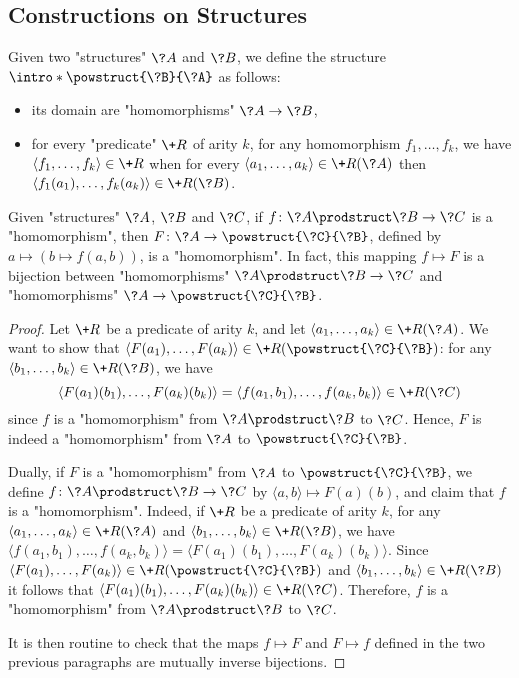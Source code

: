 \subsection{Constructions on Structures}

Given two "structures" $\?A$ and $\?B$, we define the structure \AP$\intro*\powstruct{\?B}{\?A}$ as follows:
\begin{itemize}
  \item its domain are "homomorphisms" $\?A \to \?B$,
  \item for every "predicate" $\+R$ of arity $k$, for any homomorphism $f_1,\hdots,f_k$,
  we have $\langle f_1,\hdots,f_k\rangle \in \+R$ when for every
  $\langle a_1,\hdots,a_k\rangle \in \+R(\?A)$
  then $\langle f_1(a_1), \hdots, f_k(a_k) \rangle \in \+R(\?B)$.
\end{itemize}


\begin{proposition}
	\AP\label{prop:currying-hom}
	Given "structures" $\?A$, $\?B$ and $\?C$, if $f\colon \?A\prodstruct \?B \to \?C$
	is a "homomorphism", then $F\colon \?A \to \powstruct{\?C}{\?B}$,
	defined by $a \mapsto (b \mapsto f(a,b))$, is a "homomorphism".
	In fact, this mapping $f \mapsto F$ is a bijection
	between "homomorphisms" $\?A\prodstruct \?B \to \?C$
	and "homomorphisms" $\?A \to \powstruct{\?C}{\?B}$.
\end{proposition}

\begin{proof}
Let $\+R$ be a predicate of arity $k$, and let
$\langle a_1,\hdots,a_k \rangle \in \+R(\?A)$.
We want to show that $\langle F(a_1),\hdots,F(a_k) \rangle \in \+R(\powstruct{\?C}{\?B})$:
for any $\langle b_1,\hdots,b_k \rangle \in \+R(\?B)$, we have
\[\langle F(a_1)(b_1), \hdots, F(a_k)(b_k)\rangle = \langle f(a_1,b_1),\hdots,f(a_k,b_k) \rangle \in \+R(\?C)\] since $f$ is a "homomorphism" from $\?A\prodstruct \?B$ to $\?C$.
Hence, $F$ is indeed a "homomorphism" from $\?A$ to $\powstruct{\?C}{\?B}$.

Dually, if $F$ is a "homomorphism" from $\?A$ to $\powstruct{\?C}{\?B}$,
we define $f\colon \?A\prodstruct \?B \to \?C$ by $\langle a,b \rangle \mapsto F(a)(b)$,
and claim that $f$ is a "homomorphism". Indeed, if $\+R$ be a predicate of arity $k$,
for any $\langle a_1, \hdots, a_k \rangle \in \+R(\?A)$
and $\langle b_1, \hdots, b_k \rangle \in \+R(\?B)$,
we have $\langle f(a_1,b_1), \hdots, f(a_k,b_k) \rangle
= \langle F(a_1)(b_1), \hdots, F(a_k)(b_k) \rangle$.
Since $\langle F(a_1), \hdots, F(a_k) \rangle \in \+R(\powstruct{\?C}{\?B})$
and $\langle b_1, \hdots,b_k \rangle \in \+R(\?B)$ 
it follows that $\langle F(a_1)(b_1), \hdots, F(a_k)(b_k) \rangle \in \+R(\?C)$.
Therefore, $f$ is a "homomorphism" from $\?A \prodstruct \?B$ to $\?C$.

It is then routine to check that the maps $f \mapsto F$ and $F \mapsto f$ defined
in the two previous paragraphs are mutually inverse bijections.
\end{proof}

